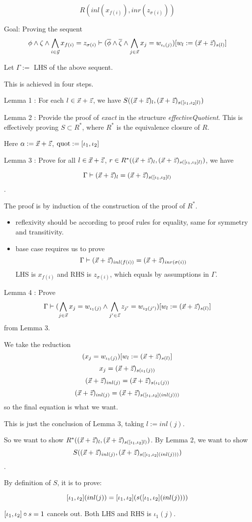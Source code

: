 \[R(inl(x_{f(i)}),inr(z_{\sigma(i)}))\]

Goal: Proving the sequent
\[\phi\land \zeta\land \bigwedge_{i\in \vec{y}} x_{f(i)} = z_{\sigma(i)}\vdash (\overline{\phi}\land \overline{\zeta}\land\bigwedge_{j\in\vec{x}} x_j = w_{\iota_i(j)})[w_l:=(\vec{x}+\vec{z})_{s(l)}] \]

Let $\Gamma :=$ LHS of the above sequent.

This is achieved in four steps.

Lemma 1 : For each $l\in \vec{x}+\vec{z}$, we have $S((\vec{x}+\vec{z})_l, (\vec{x}+\vec{z})_{s([\iota_1,\iota_2] l)})$

Lemma 2 : Provide the proof of \emph{exact} in the structure \emph{effectiveQuotient}. This is effectively proving $S\subset R^*$, where $R^*$ is the equivalence closure of $R$.

Here $\alpha:= \vec{x}+\vec{z}$, $\text{quot}:= [\iota_1,\iota_2]$

Lemma 3 : Prove for all $l\in \vec{x}+\vec{z}$, $r\in R^*((\vec{x}+\vec{z})_l,(\vec{x}+\vec{z})_{s([\iota_1,\iota_2] l)})$, we have


\[\Gamma \vdash (\vec{x}+\vec{z})_l = (\vec{x}+\vec{z})_{s([\iota_1,\iota_2] l)}\].

The proof is by induction of the construction of the proof of $R^*$.

\begin{itemize}
    \item reflexivity should be according to proof rules for equality, same for symmetry and transitivity.
    \item base case requires us to prove
    \[\Gamma\vdash (\vec{x}+\vec{z})_{inl(f(i))} = (\vec{x}+\vec{z})_{inr(\sigma(i))}\]
    LHS is $x_{f(i)}$ and RHS is $z_{\sigma(i)}$, which equals by assumptions in $\Gamma$.
\end{itemize}

Lemma 4 : Prove
\[\Gamma \vdash (\bigwedge_{j\in\vec{x}}x_j = w_{\iota_1(j)}\land \bigwedge_{j'\in\vec{z}}z_{j'}= w_{\iota_2(j')}) [w_l:=(\vec{x}+\vec{z})_{s(l)}] \]
from Lemma 3.

We take the reduction
\[(x_j = w_{\iota_1(j)}) [w_l:=(\vec{x}+\vec{z})_{s(l)}]\]
\[x_j = (\vec{x}+\vec{z})_{s(\iota_1(j))}\]
\[(\vec{x}+\vec{z})_{inl(j)} = (\vec{x}+\vec{z})_{s(\iota_1(j))}\]
\[(\vec{x}+\vec{z})_{inl(j)} = (\vec{x}+\vec{z})_{s([\iota_1,\iota_2] (inl(j)))}\]
so the final equation is what we want.

This is just the conclusion of Lemma 3, taking $l := inl(j)$.

So we want to show $R^*((\vec{x}+\vec{z})_l,(\vec{x}+\vec{z})_{s([\iota_1,\iota_2] l)})$. By Lemma 2, we want to show \[S((\vec{x}+\vec{z})_{inl(j)},(\vec{x}+\vec{z})_{s([\iota_1,\iota_2] (inl(j)))})\].

By definition of $S$, it is to prove:

\[[\iota_1,\iota_2] (inl(j)) = [\iota_1,\iota_2] (s([\iota_1,\iota_2] (inl(j)))) \]

$[\iota_1,\iota_2]\circ s = 1$ cancels out. Both LHS and RHS is $\iota_1(j)$.

